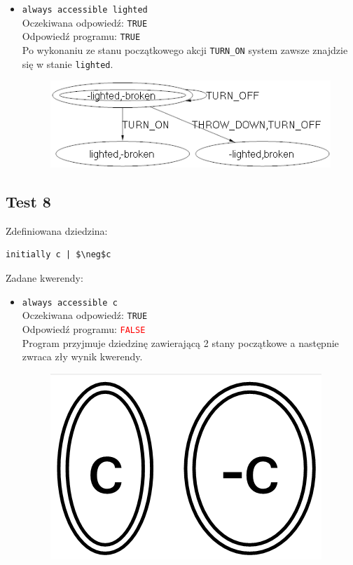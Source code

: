 \documentclass{article}
\begin{document}
\begin{itemize}
    \item {\large\texttt{always accessible lighted}}\\
	Oczekiwana odpowiedź: \texttt{TRUE}\\
    Odpowiedź programu: \texttt{TRUE}\\
    Po wykonaniu ze stanu początkowego akcji \texttt{TURN\_ON} system zawsze znajdzie się w stanie \texttt{lighted}.
    \begin{figure}[H]
    \centering
    \includegraphics[scale=0.5]{7_3}
    \end{figure}

\end{itemize}


\newpage
\subsection{Test 8}
Zdefiniowana dziedzina:
\bigskip
{}
\begin{lstlisting}[mathescape=true]
initially c | $\neg$c
\end{lstlisting}
\vspace{1cm}
Zadane kwerendy:
\begin{itemize}
	\item {\large\texttt{always accessible c}}\\
	Oczekiwana odpowiedź: \texttt{TRUE}\\
	Odpowiedź programu: \textcolor{red}{\texttt{FALSE}}\\
	Program przyjmuje dziedzinę zawierającą 2 stany początkowe a następnie zwraca zły wynik kwerendy.
	\begin{figure}[H]
		\centering
		\includegraphics[scale=0.3]{c3}
	\end{figure}
\end{itemize}
\newpage
\end{document}
